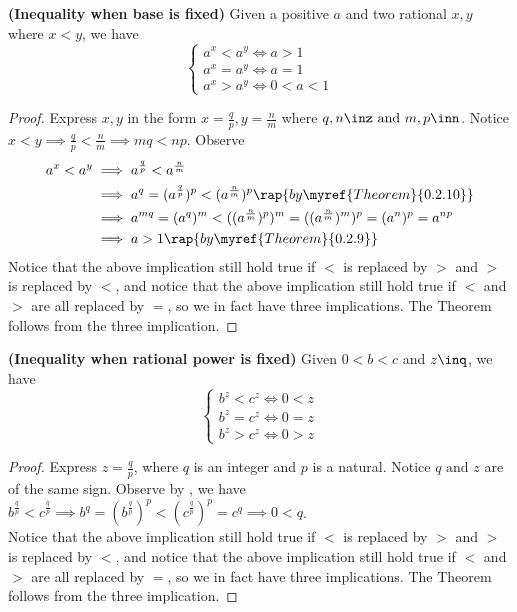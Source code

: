 \documentclass{report}
\begin{document}
\begin{theorem}
\label{1.3.10}
\textbf{(Inequality when base is fixed)} Given a positive $a$ and two rational  $x,y$ where  $x<y$, we have
 \begin{equation*}
\begin{cases}
  a^x<a^y\iff a>1\\
  a^x=a^y\iff a=1\\
  a^x>a^y\iff 0<a<1
\end{cases}
\end{equation*}
\end{theorem}
\begin{proof}
  Express $x,y$ in the form $x=\frac{q}{p},y=\frac{n}{m}$ where $q,n\inz\text{ and }m,p\inn$. Notice $x<y\implies \frac{q}{p}<\frac{n}{m}\implies mq<np$. Observe
  \begin{align*}
    a^x<a^y &\implies a^{\frac{q}{p}}<a^{\frac{n}{m}}\\
  &\implies a^q=(a^{\frac{q}{p}})^p<(a^{\frac{n}{m}})^p\rap{by \myref{Theorem}{0.2.10}}\\
  &\implies a^{mq}=(a^q)^m<((a^{\frac{n}{m}})^p)^m=((a^{\frac{n}{m}})^m)^p=(a^n)^p=a^{np}\\
  &\implies a>1\rap{by \myref{Theorem}{0.2.9}} 
  \end{align*}
  Notice that the above implication still hold true if $<$ is replaced by $>$ and $>$ is replaced by  $<$, and notice that the above implication still hold true if $<$ and  $>$ are all replaced by $=$, so we in fact have three implications. The Theorem follows from the three implication.
   
\end{proof}
\begin{theorem}
\label{1.3.11}
\textbf{(Inequality when rational power is fixed)} Given $0<b<c$ and  $z\inq$, we have
\begin{equation*}
\begin{cases}
  b^z<c^z \iff 0<z\\
  b^z=c^z \iff 0=z\\
  b^z>c^z\iff 0>z
\end{cases}
\end{equation*}
\end{theorem}
\begin{proof}
Express $z=\frac{q}{p}$, where $q$ is an integer and $p$ is a natural. Notice $q\text{ and }z$ are of the same sign. Observe by , we have $b^{\frac{q}{p}}<c^{\frac{q}{p}}\implies b^q=(b^{\frac{q}{p}})^p<(c^{\frac{q}{p}})^p=c^q\implies 0<q$.\\

  Notice that the above implication still hold true if $<$ is replaced by $>$ and $>$ is replaced by  $<$, and notice that the above implication still hold true if $<$ and  $>$ are all replaced by $=$, so we in fact have three implications. The Theorem follows from the three implication.
\end{proof}
\end{document}
